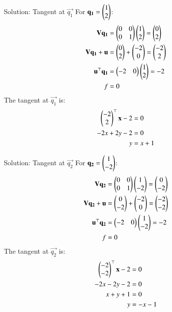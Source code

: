 \documentclass{beamer}
\begin{document}
\begin{frame}{Solution: Tangent at $\vec{q_1}$}
For $\mathbf{q_1} = \begin{pmatrix}1 \\ 2\end{pmatrix}$:
\begin{align}
\mathbf{V}\mathbf{q_1} &= \begin{pmatrix}0 & 0 \\ 0 & 1\end{pmatrix}\begin{pmatrix}1 \\ 2\end{pmatrix} = \begin{pmatrix}0\\ 2\end{pmatrix} \\
\mathbf{V}\mathbf{q_1} + \mathbf{u} &= \begin{pmatrix}0 \\ 2\end{pmatrix} + \begin{pmatrix}-2 \\ 0\end{pmatrix} = \begin{pmatrix}-2 \\ 2\end{pmatrix} \\
\mathbf{u}^{\top}\mathbf{q_1} &= \begin{pmatrix}-2 & 0\end{pmatrix}\begin{pmatrix}1 \\ 2\end{pmatrix} = -2 \\
f &= 0
\end{align}
The tangent at $\vec{q_1}$ is:
\begin{align}
\begin{pmatrix}-2 \\ 2\end{pmatrix}^{\top}\mathbf{x} - 2 &= 0 \\
-2x + 2y - 2 &= 0 \\
y &= x+1 \label{eq:tangent1}
\end{align}
\end{frame}

\begin{frame}{Solution: Tangent at $\vec{q_2}$}
For $\mathbf{q_2} = \begin{pmatrix}1 \\ -2\end{pmatrix}$:
\begin{align}
\mathbf{V}\mathbf{q_2} &= \begin{pmatrix}0 & 0 \\ 0 & 1\end{pmatrix}\begin{pmatrix}1 \\ -2\end{pmatrix} = \begin{pmatrix}0 \\ -2\end{pmatrix} \\
\mathbf{V}\mathbf{q_2} + \mathbf{u} &= \begin{pmatrix}0 \\ -2\end{pmatrix} + \begin{pmatrix}-2 \\ 0\end{pmatrix} = \begin{pmatrix}-2 \\ -2\end{pmatrix} \\
\mathbf{u}^{\top}\mathbf{q_2} &= \begin{pmatrix}-2 & 0\end{pmatrix}\begin{pmatrix}1 \\ -2\end{pmatrix} = -2 \\
f &= 0
\end{align}
The tangent at $\vec{q_2}$ is:
\begin{align}
\begin{pmatrix}-2 \\ -2\end{pmatrix}^{\top}\mathbf{x} - 2 &= 0 \\
-2x - 2y - 2 &= 0 \\
x + y + 1 &= 0 \\
y &= -x-1\label{eq:tangent2}
\end{align}
\end{frame}
\end{document}
